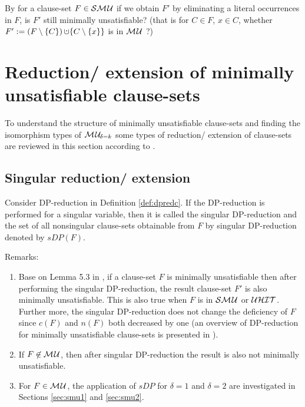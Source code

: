 \documentclass{report}
\begin{document}
\begin{quest}\label{que:smu-elim}
By \cite{h9} for a clause-set $F \in \mathcal{S}\mathcal{M\hspace{0.8pt}U}$ if we obtain $F'$ by eliminating a literal occurrences in $F$, is $F'$ still minimally unsatisfiable? (that is for $C \in F$, $x \in C$, whether $F' := (F \sm \set{C}) \addcup \set{C \sm \set{x}}$ is in $\mathcal{M\hspace{0.8pt}U}$ ?)
\end{quest}
\section{Reduction/ extension of minimally unsatisfiable clause-sets}
\label{sec:r-e}

To understand the structure of minimally unsatisfiable clause-sets and finding the isomorphism types of $\mathcal{M\hspace{0.8pt}U}_{\!\delta=k}$ some types of reduction/ extension of clause-sets are reviewed in this section according to \cite{h9,h29}.

\subsection{Singular reduction/ extension}
\label{sec:sing-re} 

\begin{defi}\label{def:singularDP}
Consider DP-reduction in Definition \ref{def:dpredc}. If the DP-reduction is performed for a singular variable, then it is called the singular DP-reduction and the set of all nonsingular clause-sets obtainable from $F$ by singular DP-reduction denoted by $sDP(F)$. 
\end{defi}
Remarks:
  \begin{enumerate}
  \item Base on Lemma 5.3 in \cite{h9}, if a clause-set $F$ is minimally unsatisfiable then after performing the singular DP-reduction, the result clause-set $F'$ is also minimally unsatisfiable. This is also true when $F$ is in $\mathcal{S}\mathcal{M\hspace{0.8pt}U}$ or $\mathcal{U}\mathcal{HIT}$.   Further more, the singular DP-reduction does not change the deficiency of $F$ since $c(F)$ and $n(F)$ both decreased by one (an overview of DP-reduction for minimally unsatisfiable clause-sets is presented in \cite{h29}).
  \item If $F \not \in \mathcal{M\hspace{0.8pt}U}$, then after singular DP-reduction the result is also not minimally unsatisfiable.
  \item For $F \in \mathcal{M\hspace{0.8pt}U}$, the application of $sDP$ for $\delta=1$ and $\delta=2$ are investigated in Sections \ref{sec:smu1} and \ref{sec:smu2}.
  \end{enumerate}
  
\end{document}
